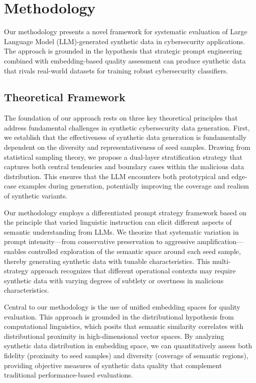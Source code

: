 \section{Methodology}

Our methodology presents a novel framework for systematic evaluation of Large Language Model (LLM)-generated synthetic data in cybersecurity applications. The approach is grounded in the hypothesis that strategic prompt engineering combined with embedding-based quality assessment can produce synthetic data that rivals real-world datasets for training robust cybersecurity classifiers.

\subsection{Theoretical Framework}

The foundation of our approach rests on three key theoretical principles that address fundamental challenges in synthetic cybersecurity data generation. First, we establish that the effectiveness of synthetic data generation is fundamentally dependent on the diversity and representativeness of seed samples. Drawing from statistical sampling theory, we propose a dual-layer stratification strategy that captures both central tendencies and boundary cases within the malicious data distribution. This ensures that the LLM encounters both prototypical and edge-case examples during generation, potentially improving the coverage and realism of synthetic variants.

Our methodology employs a differentiated prompt strategy framework based on the principle that varied linguistic instruction can elicit different aspects of semantic understanding from LLMs. We theorize that systematic variation in prompt intensity—from conservative preservation to aggressive amplification—enables controlled exploration of the semantic space around each seed sample, thereby generating synthetic data with tunable characteristics. This multi-strategy approach recognizes that different operational contexts may require synthetic data with varying degrees of subtlety or overtness in malicious characteristics.

Central to our methodology is the use of unified embedding spaces for quality evaluation. This approach is grounded in the distributional hypothesis from computational linguistics, which posits that semantic similarity correlates with distributional proximity in high-dimensional vector spaces. By analyzing synthetic data distribution in embedding space, we can quantitatively assess both fidelity (proximity to seed samples) and diversity (coverage of semantic regions), providing objective measures of synthetic data quality that complement traditional performance-based evaluations.

